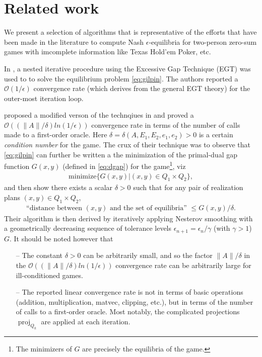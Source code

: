 \documentclass{article} %
\DeclareMathOperator{\proj}{proj}
\begin{document}
\section{Related work}
\label{sec:related_work}
We present a selection of algorithms that is representative of the
efforts that have been made in the literature to compute Nash
$\epsilon$-equilibria for two-person zero-sum games with imcomplete
information like Texas Hold'em Poker, etc.

In \cite{hoda2010smoothing}, a nested iterative procedure using the
Excessive Gap Technique (EGT) \cite{nesterov2005excessive} was used to
to solve the equilibrium problem \eqref{eq:gilpin}.
The authors reported a $\mathcal{O}(1/\epsilon)$ convergence rate
(which derives from the general EGT theory) for the outer-most
iteration loop.

\cite{gilpinfirst} proposed a modified verson of the technqiues in
\cite{hoda2010smoothing} and  proved a $\mathcal{O}\left(\left(\|A\| /
\delta\right) ln\left(1 / \epsilon\right)\right)$ convergence rate in
terms of the number of calls made to a first-order oracle. Here
$\delta = \delta(A, E_1, E_2, e_1, e_2) > 0$ is a certain
\textit{condition number} for the game. The crux of their technique was to
observe that \eqref{eq:gilpin} can further be written a the minimization of
the primal-dual gap function $G(x, y)$ (defined in \eqref{eq:dgap})
for the game\footnote{The minimizers of $G$ are precisely the
  equilibria of the game.}, viz
\begin{eqnarray}
\mathrm{minimize}\{G(x,y)|(x,y) \in Q_1 \times Q_2\},
\end{eqnarray}
and then show there exists a scalar
$\delta > 0$ such that for any pair of realization plans $(x, y) \in Q_1 \times Q_2$,
\begin{eqnarray}
\text{``distance between }(x, y)\text{ and the set of
equilibria'' } \le G(x, y)/\delta.
\end{eqnarray}
Their
algorithm is then derived by iteratively applying Nesterov smoothing \cite{nesterov2005a}
with a geometrically decreasing sequence of tolerance levels
$\epsilon_{n+1} = \epsilon_n / \gamma$ (with $\gamma > 1$)  $G$. It
should be noted however that
\begin{itemize}
\item[--] The constant $\delta > 0$ can be arbitrarily small, and so
  the factor $\|A\| / \delta$ in the $\mathcal{O}\left(\left(\|A\| /
\delta\right) ln\left(1 / \epsilon\right)\right)$ convergence rate can
be arbitrarily large for ill-conditioned games.
\item[--] The reported linear convergence rate is not in terms of
  basic operations (addition, multiplication, matvec, clipping, etc.),
  but in terms of the number of calls to a first-order oracle. Most
  notably, the complicated projections $\proj_{Q_k}$ are applied at
  each iteration.%

\end{itemize}
\end{document}
